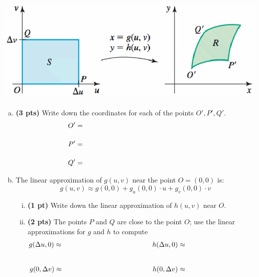 \documentclass[12pt]{article}
\begin{document}
\vspace{-1.5pc}
\begin{center}
\includegraphics[scale=0.75]{Q9pic}
\end{center}

\begin{enumerate}[(a)]
\item {\bf (3 pts)} 
Write down the coordinates for each of the points $O',P',Q'$.
\[\begin{split}
O' &= \hspace{40ex} \\[1pc]
P' &= \hspace{40ex} \\[1pc]
Q' &= \hspace{40ex}
\end{split}\]

\newpage
\item The linear approximation of $g(u,v)$ near the point $O=(0,0)$ is:  
\vspace{-0.5pc}
\[
\textstyle g(u,v)\approx g(0,0) + g_u(0,0)\cdot u%
+ g_v(0,0)\cdot v
\] 

\begin{enumerate}[i. ]
	\item {\bf (1 pt)} Write down the linear approximation of $h(u,v)$ near $O$.
	\vspace{3pc}
	
	\item {\bf (2 pts)} The points $P$ and $Q$ are close to the point $O$; use the linear approximations for $g$ and $h$ to compute 
	\[\begin{split}
	g(\Delta u,0) \approx \hspace{30ex} h(\Delta u,0) \approx &	\hspace{25ex} \\[1.75pc]
	g(0,\Delta v) \approx \hspace{30ex} h(0,\Delta v) \approx &
	\end{split}\]
	\vspace{0.5pc}
	

\end{enumerate}
\end{enumerate}
\end{document}
